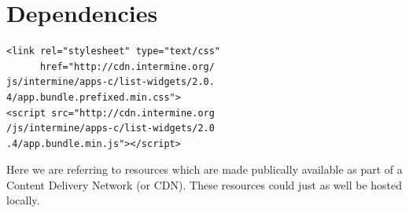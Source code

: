\documentclass[10pt,a4paper,twocolumn]{article}
\begin{document}
\appendix
\section{Dependencies} \label{app:deps}

\lstset{language=HTML}

\begin{lstlisting}
<link rel="stylesheet" type="text/css"
      href="http://cdn.intermine.org/
js/intermine/apps-c/list-widgets/2.0.
4/app.bundle.prefixed.min.css">
<script src="http://cdn.intermine.org
/js/intermine/apps-c/list-widgets/2.0
.4/app.bundle.min.js"></script>
\end{lstlisting}

Here we are referring to resources which are made publically available
as part of a Content Delivery Network (or CDN). These resources could just
as well be hosted locally.






\end{document}

